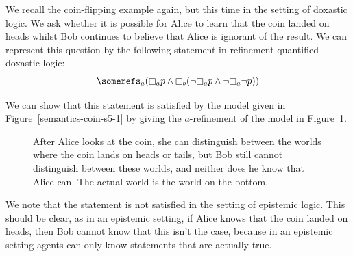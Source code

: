 \begin{example}\label{semantics-coin-kd45}
We recall the coin-flipping example again, but this time in the setting of
doxastic logic. We ask whether it is possible for Alice to learn that the coin
landed on heads whilst Bob continues to believe that Alice is ignorant of the
result. We can represent this question by the following statement in refinement
quantified doxastic logic:
$$\somerefs_a (\knows_a p \land \knows_b (\neg \knows_a p \land \neg \knows_a
\neg p))$$

We can show that this statement is satisfied by the model given in
Figure~\ref{semantics-coin-s5-1} by giving the $a$-refinement of the
model in Figure~\ref{semantics-coin-kd45-1}.

\begin{figure}
\begin{center} 
\caption{\label{semantics-coin-kd45-1}
After Alice looks at the coin, she can distinguish between the worlds where the
coin lands on heads or tails, but Bob still cannot distinguish between these
worlds, and neither does he know that Alice can. The actual world is the world
on the bottom.
}
\end{center}
\end{figure}

We note that the statement is not satisfied in the setting of epistemic logic.
This should be clear, as in an epistemic setting, if Alice knows that the coin
landed on heads, then Bob cannot know that this isn't the case, because in an
epistemic setting agents can only know statements that are actually true.
\end{example}

